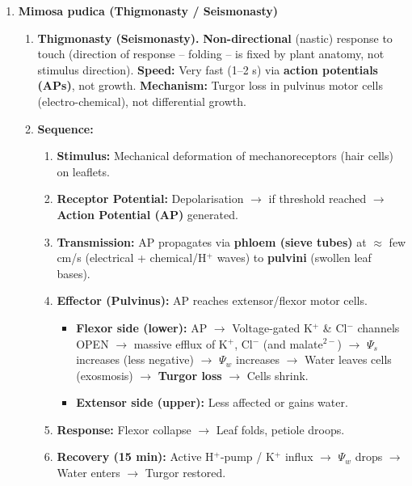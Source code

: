 \documentclass[11pt]{article}
\begin{document}
\begin{enumerate}
    \item \textbf{Mimosa pudica (Thigmonasty / Seismonasty)}
    \begin{enumerate}
        \item \textbf{Thigmonasty (Seismonasty).} \textbf{Non-directional} (nastic) response to touch (direction of response -- folding -- is fixed by plant anatomy, not stimulus direction). \textbf{Speed:} Very fast (1--2 s) via \textbf{action potentials (APs)}, not growth. \textbf{Mechanism:} Turgor loss in pulvinus motor cells (electro-chemical), not differential growth.
        \item \textbf{Sequence:}
        \begin{enumerate}
            \item \textbf{Stimulus:} Mechanical deformation of mechanoreceptors (hair cells) on leaflets.
            \item \textbf{Receptor Potential:} Depolarisation $\rightarrow$ if threshold reached $\rightarrow$ \textbf{Action Potential (AP)} generated.
            \item \textbf{Transmission:} AP propagates via \textbf{phloem (sieve tubes)} at $\approx$ few cm/s (electrical + chemical/H$^+$ waves) to \textbf{pulvini} (swollen leaf bases).
            \item \textbf{Effector (Pulvinus):} AP reaches extensor/flexor motor cells.
                \begin{itemize}
                    \item \textbf{Flexor side (lower):} AP $\rightarrow$ Voltage-gated K$^+$ \& Cl$^-$ channels OPEN $\rightarrow$ massive efflux of K$^+$, Cl$^-$ (and malate$^{2-}$) $\rightarrow$ $\Psi_s$ increases (less negative) $\rightarrow$ $\Psi_w$ increases $\rightarrow$ Water leaves cells (exosmosis) $\rightarrow$ \textbf{Turgor loss} $\rightarrow$ Cells shrink.
                    \item \textbf{Extensor side (upper):} Less affected or gains water.
                \end{itemize}
            \item \textbf{Response:} Flexor collapse $\rightarrow$ Leaf folds, petiole droops.
            \item \textbf{Recovery (15 min):} Active H$^+$-pump / K$^+$ influx $\rightarrow$ $\Psi_w$ drops $\rightarrow$ Water enters $\rightarrow$ Turgor restored.
        \end{enumerate}
    \end{enumerate}


\end{enumerate}
\end{document}
